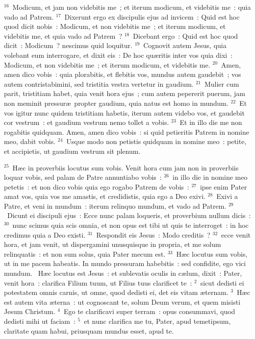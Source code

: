 ${}^{16}$~Modicum, et jam non videbitis me~; et iterum modicum, et videbitis me~: quia vado ad Patrem.
${}^{17}$~Dixerunt ergo ex discipulis ejus ad invicem~: Quid est hoc quod dicit nobis~: Modicum, et non videbitis me~; et iterum modicum, et videbitis me, et quia vado ad Patrem~?
${}^{18}$~Dicebant ergo~: Quid est hoc quod dicit~: Modicum~? nescimus quid loquitur.
${}^{19}$~Cognovit autem Jesus, quia volebant eum interrogare, et dixit eis~: De hoc qu\ae ritis inter vos quia dixi~: Modicum, et non videbitis me~; et iterum modicum, et videbitis me.
${}^{20}$~Amen, amen dico vobis~: quia plorabitis, et flebitis vos, mundus autem gaudebit~; vos autem contristabimini, sed tristitia vestra vertetur in gaudium.
${}^{21}$~Mulier cum parit, tristitiam habet, quia venit hora ejus~; cum autem pepererit puerum, jam non meminit pressur\ae\ propter gaudium, quia natus est homo in mundum.
${}^{22}$~Et vos igitur nunc quidem tristitiam habetis, iterum autem videbo vos, et gaudebit cor vestrum~: et gaudium vestrum nemo tollet a vobis.
${}^{23}$~Et in illo die me non rogabitis quidquam. Amen, amen dico vobis~: si quid petieritis Patrem in nomine meo, dabit vobis.
${}^{24}$~Usque modo non petistis quidquam in nomine meo~: petite, et accipietis, ut gaudium vestrum sit plenum.


${}^{25}$~H\ae c in proverbiis locutus sum vobis. Venit hora cum jam non in proverbiis loquar vobis, sed palam de Patre annuntiabo vobis~:
${}^{26}$~in illo die in nomine meo petetis~: et non dico vobis quia ego rogabo Patrem de vobis~:
${}^{27}$~ipse enim Pater amat vos, quia vos me amastis, et credidistis, quia ego a Deo exivi.
${}^{28}$~Exivi a Patre, et veni in mundum~: iterum relinquo mundum, et vado ad Patrem.
${}^{29}$~Dicunt ei discipuli ejus~: Ecce nunc palam loqueris, et proverbium nullum dicis~:
${}^{30}$~nunc scimus quia scis omnia, et non opus est tibi ut quis te interroget~: in hoc credimus quia a Deo existi.
${}^{31}$~Respondit eis Jesus~: Modo creditis~?
${}^{32}$~ecce venit hora, et jam venit, ut dispergamini unusquisque in propria, et me solum relinquatis~: et non sum solus, quia Pater mecum est.
${}^{33}$~H\ae c locutus sum vobis, ut in me pacem habeatis. In mundo pressuram habebitis~: sed confidite, ego vici mundum.
~\lettrine[lines=10,image=true,loversize=0.05,lraise=-0.03]{H}{}\ae c locutus est Jesus~: et sublevatis oculis in c\ae lum, dixit~: Pater, venit hora~: clarifica Filium tuum, ut Filius tuus clarificet te~:
${}^{2}$~sicut dedisti ei potestatem omnis carnis, ut omne, quod dedisti ei, det eis vitam \ae ternam.
${}^{3}$~H\ae c est autem vita \ae terna~: ut cognoscant te, solum Deum verum, et quem misisti Jesum Christum.
${}^{4}$~Ego te clarificavi super terram~: opus consummavi, quod dedisti mihi ut faciam~:
${}^{5}$~et nunc clarifica me tu, Pater, apud temetipsum, claritate quam habui, priusquam mundus esset, apud te.


